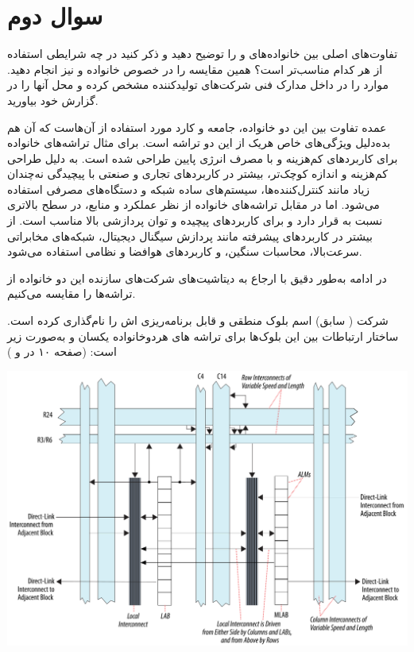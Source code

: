 \section{سوال دوم}
تفاوت‌های اصلی بین خانواده‌های  و  را توضیح دهید و ذکر کنید در چه شرایطی استفاده از هر کدام مناسب‌تر است؟ همین مقایسه را در خصوص خانواده  و  نیز انجام دهید. موارد را در داخل مدارک فنی شرکت‌های تولیدکننده مشخص کرده و محل آنها را در گزارش خود بیاورید.





\begin{qsolve}
	عمده تفاوت بین این دو خانواده، جامعه و کارد مورد استفاده از آن‌هاست که آن هم بده‌دلیل ویژگی‌های خاص هر‌یک از این دو تراشه است. برای مثال تراشه‌های خانواده  برای کاربردهای کم‌هزینه و با مصرف انرژی پایین طراحی شده است. به دلیل طراحی کم‌هزینه و اندازه کوچک‌تر، بیشتر در کاربردهای تجاری و صنعتی با پیچیدگی نه‌چندان زیاد مانند کنترل‌کننده‌ها، سیستم‌های ساده شبکه و دستگاه‌های مصرفی استفاده می‌شود. اما در مقابل تراشه‌های خانواده  از نظر عملکرد و منابع، در سطح بالاتری نسبت به  قرار دارد و برای کاربردهای پیچیده و توان پردازشی بالا مناسب است. از  بیشتر در کاربردهای پیشرفته مانند پردازش سیگنال دیجیتال، شبکه‌های مخابراتی سرعت‌بالا، محاسبات سنگین، و کاربردهای هوافضا و نظامی استفاده می‌شود.
	
	در ادامه به‌طور دقیق با ارجاع به دیتاشیت‌های شرکت‌های سازنده این دو خانواده از تراشه‌ها را مقایسه می‌کنیم.
	
	
	شرکت  ( سابق) اسم بلوک منطقی و قابل برنامه‌ریزی اش را 
	نام‌گذاری کرده است. ساختار ارتباطات بین این بلوک‌ها برای تراشه های هردوخانواده یکسان و به‌صورت زیر است: (صفحه ۱۰ در \cite{ref1} و \cite{ref2})
	
	\begin{center}
		\includegraphics*[width=0.8\linewidth]{pics/img2.png}
		\label{ساختار ارتباطات میان LAB ها}
	\end{center}



\end{qsolve}
